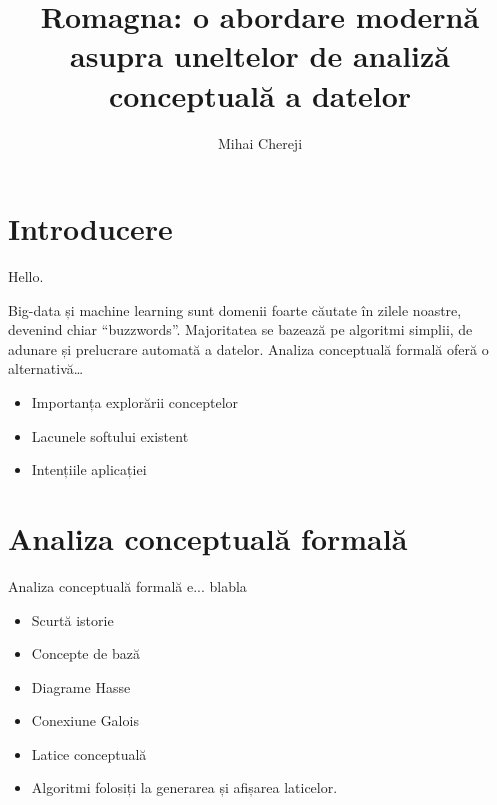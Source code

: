 \documentclass[12pt, a4paper, oneside, romanian]{teza-upb}
\begin{document}
\author{Mihai Chereji}

\title{Romagna: o abordare modernă asupra uneltelor de analiză conceptuală a datelor}




\beforepreface
\listoffigures
\listoftables
{}
\afterpreface 
\chapter{Introducere}
Hello\cite{punguta1876}.


Big-data și machine learning sunt domenii foarte căutate în zilele noastre, devenind chiar “buzzwords”. Majoritatea se bazează pe algoritmi simplii, de adunare și prelucrare automată a datelor.
Analiza conceptuală formală oferă o alternativă…

\begin{itemize}
  \item Importanța explorării conceptelor
  \item Lacunele softului existent
  \item Intențiile aplicației
\end{itemize}

\chapter{Analiza conceptuală formală}
  Analiza conceptuală formală e... blabla
  \begin{itemize}
    \item Scurtă istorie
    \item Concepte de bază
    \item Diagrame Hasse
    \item Conexiune Galois
    \item Latice conceptuală
    \item Algoritmi folosiți la generarea și afișarea laticelor.
  \end{itemize}
\end{document}
